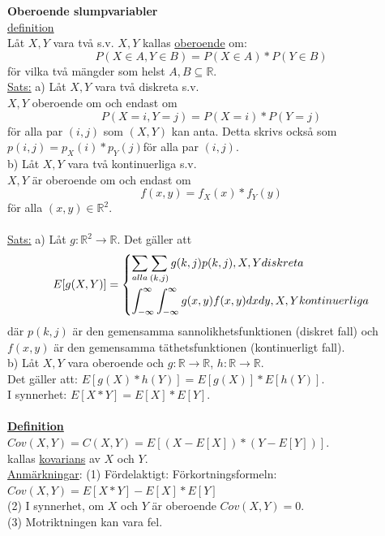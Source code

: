 \documentclass[8pt]{extarticle}
\begin{document}
\begin{multicols*}{2}
\textbf{Oberoende slumpvariabler}\\
\underline{definition}\\
Låt $X,Y$ vara två s.v. $X,Y$ kallas \underline{oberoende} om:
\begin{equation*}
P(X \in A, Y \in B) = P(X \in A) * P(Y \in B)
\end{equation*} 
för vilka två mängder som helst $A,B \subseteq \mathbb{R}$.\\
\underline{Sats:} a) Låt $X,Y$ vara två diskreta s.v.\\
$X,Y$ oberoende om och endast om 
\begin{equation*}
P(X = i, Y=j) = P(X = i) * P(Y = j)
\end{equation*}
för alla par $(i,j)$ som $(X,Y)$ kan anta. Detta skrivs också som $p(i,j) = p_X(i) * p_Y(j)$för alla par $(i,j)$.\\
b) Låt $X,Y$ vara två kontinuerliga s.v.\\
$X,Y$ är oberoende om och endast om 
\begin{equation*}
f(x,y) = f_X(x) * f_Y(y)
\end{equation*}
för alla $(x,y) \in \mathbb{R}^2$.\\
\\
\underline{Sats:} a) Låt $g: \mathbb{R}^2 \longrightarrow \mathbb{R}$. Det gäller att
\begin{equation*}
E[g(X,Y)] = 
	\begin{dcases}
		\sum_{alla}\sum_{(k,j)}g(k,j)p(k,j), X,Y diskreta\\
		\int_{-\infty}^{\infty}\int_{-\infty}^{\infty}g(x,y)f(x,y)dxdy, X,Y kontinuerliga
	\end{dcases}
\end{equation*}
där $p(k,j)$ är den gemensamma sannolikhetsfunktionen (diskret fall) och $f(x,y)$ är den gemensamma täthetsfunktionen (kontinuerligt fall).\\
b) Låt $X,Y$ vara oberoende och $g: \mathbb{R} \longrightarrow \mathbb{R}$, $h: \mathbb{R} \longrightarrow \mathbb{R}$. \\
Det gäller att: $E[g(X)*h(Y)] = E[g(X)] * E[h(Y)]$. \\
I synnerhet: $E[X*Y] = E[X] * E[Y]$.\\
\\
\underline{\textbf{Definition}}\\
$Cov(X,Y) = C(X,Y) = E[(X - E[X]) * (Y - E[Y])]$.\\
kallas \underline{kovarians} av $X$ och $Y$.\\
\underline{Anmärkningar}: (1) Fördelaktigt: Förkortningsformeln:\\
$Cov(X,Y) = E[X*Y] - E[X] * E[Y]$\\
(2) I synnerhet, om $X$ och $Y$ är oberoende $Cov(X,Y) = 0$.\\
(3) Motriktningen kan vara fel.\\


\end{multicols*}
\end{document}
